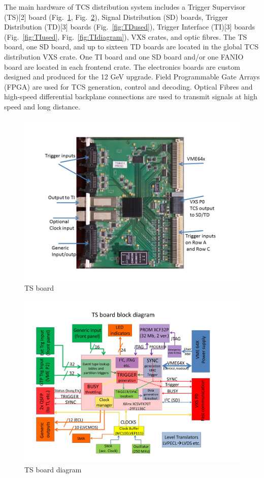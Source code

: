 The main hardware of TCS distribution system includes a Trigger Supervisor (TS)[2] board (Fig.~\ref{fig:TSused}, Fig.~\ref{fig:TSdiagram}), Signal Distribution (SD) boards, Trigger Distribution (TD)[3] boards  (Fig.~\ref{fig:TDused}), Trigger Interface (TI)[3] boards  (Fig.~\ref{fig:TIused}, Fig.~\ref{fig:TIdiagram}), VXS crates, and optic fibres.  The TS board, one SD board, and up to sixteen TD boards are located in the global TCS distribution VXS crate.  One TI board and one SD board and/or one FANIO board are located in each frontend crate.  The electronics boards are custom designed and produced for the 12 GeV upgrade.  Field Programmable Gate Arrays (FPGA) are used for TCS generation, control and decoding.  Optical Fibres and high-speed differential backplane connections are used to transmit signals at high speed and long distance.  

\begin{figure}[hbt]
	\centering
	\includegraphics[width=1.0\columnwidth,keepaspectratio]{img/TSused.jpg}
	\caption{TS board}
	\label{fig:TSused}
\end{figure}

\begin{figure}[hbt]
	\centering
	\includegraphics[width=1.0\columnwidth,keepaspectratio]{img/TSdiagram.jpg}
	\caption{TS board diagram}
	\label{fig:TSdiagram}
\end{figure}

